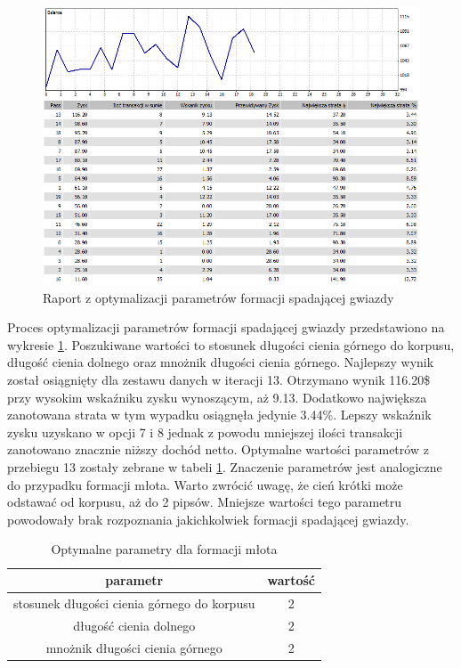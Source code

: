 \documentclass[pdflatex,11pt]{aghdpl}
\begin{document}
\begin{figure}[h!]
\begin{center}
\includegraphics[width=14cm]{shootingstar/optymalizacja.png}
\caption{Raport z optymalizacji parametrów formacji spadającej gwiazdy}
\label{opt_gwiazda}
\end{center}
\end{figure} 
Proces optymalizacji parametrów formacji spadającej gwiazdy przedstawiono na wykresie \ref{opt_gwiazda}. Poszukiwane wartości to stosunek długości cienia górnego do korpusu, długość cienia dolnego oraz mnożnik długości cienia górnego. Najlepszy wynik został osiągnięty dla zestawu danych w iteracji 13. Otrzymano wynik 116.20\$ przy wysokim wskaźniku zysku wynoszącym, aż 9.13. Dodatkowo największa zanotowana strata w tym wypadku osiągnęła jedynie 3.44\%. Lepszy wskaźnik zysku uzyskano w opcji 7 i 8 jednak z powodu mniejszej ilości transakcji zanotowano znacznie niższy dochód netto. Optymalne wartości parametrów z przebiegu 13 zostały zebrane w tabeli \ref{parametry_gwiazda}. Znaczenie parametrów jest analogiczne do przypadku formacji młota. Warto zwrócić uwagę, że cień krótki może odstawać od korpusu, aż do 2 pipsów. Mniejsze wartości tego parametru powodowały brak rozpoznania jakichkolwiek formacji spadającej gwiazdy.
\begin{table}[h!]
\begin{center}
\begin{tabular}{|c|c|}
\hline 
parametr & wartość \\
\hline
stosunek długości cienia górnego do korpusu & 2\\
\hline
długość cienia dolnego & 2\\
\hline
mnożnik długości cienia górnego & 2\\
\hline
\end{tabular} 
\caption{Optymalne parametry dla formacji młota}
\label{parametry_gwiazda}
\end{center}
\end{table}
\end{document}
